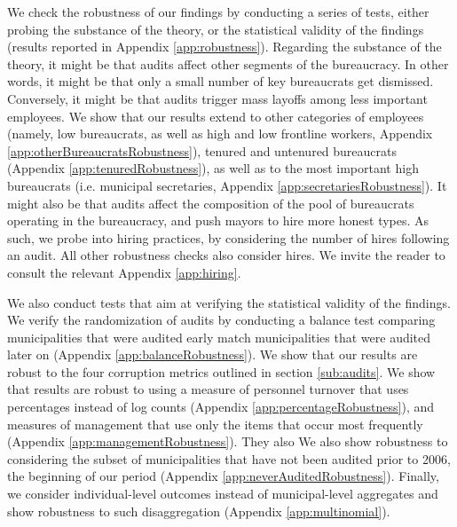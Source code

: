 We check the robustness of our findings by conducting a series of tests, either probing the substance of the theory, or the statistical validity of the findings (results reported in Appendix \ref{app:robustness}). Regarding the substance of the theory, it might be that audits affect other segments of the bureaucracy. In other words, it might be that only a small number of key bureaucrats get dismissed. Conversely, it might be that audits trigger mass layoffs among less important employees. We show that our results extend to other categories of employees (namely, low bureaucrats, as well as high and low frontline workers, Appendix \ref{app:otherBureaucratsRobustness}), tenured and untenured bureaucrats (Appendix \ref{app:tenuredRobustness}), as well as to the most important high bureaucrats (i.e. municipal secretaries, Appendix \ref{app:secretariesRobustness}). It might also be that audits affect the composition of the pool of bureaucrats operating in the bureaucracy, and push mayors to hire more honest types. As such, we probe into hiring practices, by considering the number of hires following an audit. All other robustness checks also consider hires. We invite the reader to consult the relevant Appendix \ref{app:hiring}. %

We also conduct tests that aim at verifying the statistical validity of the findings. We verify the randomization of audits by conducting a balance test comparing municipalities that were audited early match municipalities that were audited later on (Appendix \ref{app:balanceRobustness}). We show that our results are robust to the four corruption metrics outlined in section \ref{sub:audits}. We show that results are robust to using a measure of personnel turnover that uses percentages instead of log counts (Appendix \ref{app:percentageRobustness}), and measures of management that use only the items that occur most frequently (Appendix \ref{app:managementRobustness}). They also  We also show robustness to considering the subset of municipalities that have not been audited prior to 2006, the beginning of our period (Appendix \ref{app:neverAuditedRobustness}). Finally, we consider individual-level outcomes instead of municipal-level aggregates and show robustness to such disaggregation (Appendix \ref{app:multinomial}). 

